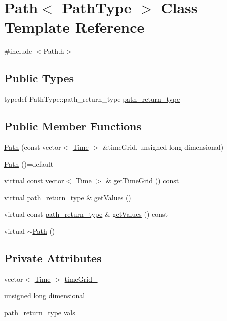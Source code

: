 \hypertarget{class_path}{}\section{Path$<$ Path\+Type $>$ Class Template Reference}
\label{class_path}


{\ttfamily \#include $<$Path.\+h$>$}

\subsection*{Public Types}
\begin{DoxyCompactItemize}
\item 
typedef Path\+Type\+::path\+\_\+return\+\_\+type \hyperlink{class_path_a3b1c34a87f7867f6fed2e0a33f801e7d}{path\+\_\+return\+\_\+type}
\end{DoxyCompactItemize}
\subsection*{Public Member Functions}
\begin{DoxyCompactItemize}
\item 
\hyperlink{class_path_af716cfa221637551e0b0a5b78be82d5c}{Path} (const vector$<$ \hyperlink{_name_def_8h_ac2d3e0ba793497bcca555c7c2cf64ff3}{Time} $>$ \&time\+Grid, unsigned long dimensional)
\item 
\hyperlink{class_path_a8437fecb95fe145057c957feb8b8955a}{Path} ()=default
\item 
virtual const vector$<$ \hyperlink{_name_def_8h_ac2d3e0ba793497bcca555c7c2cf64ff3}{Time} $>$ \& \hyperlink{class_path_a511b7a93c62893bcafba4749ad1dd1b3}{get\+Time\+Grid} () const
\item 
virtual \hyperlink{class_path_a3b1c34a87f7867f6fed2e0a33f801e7d}{path\+\_\+return\+\_\+type} \& \hyperlink{class_path_a8ba07fadae45801824240317c311bb84}{get\+Values} ()
\item 
virtual const \hyperlink{class_path_a3b1c34a87f7867f6fed2e0a33f801e7d}{path\+\_\+return\+\_\+type} \& \hyperlink{class_path_a2490ad69198170463f98c7d8f7212917}{get\+Values} () const
\item 
virtual \hyperlink{class_path_a83933167b70441af12427b23d88b0447}{$\sim$\+Path} ()
\end{DoxyCompactItemize}
\subsection*{Private Attributes}
\begin{DoxyCompactItemize}
\item 
vector$<$ \hyperlink{_name_def_8h_ac2d3e0ba793497bcca555c7c2cf64ff3}{Time} $>$ \hyperlink{class_path_a23350d9575ae171881cd45dc1ce2a701}{time\+Grid\+\_\+}
\item 
unsigned long \hyperlink{class_path_ad71125972f4c21aa8233b08dea6fca13}{dimensional\+\_\+}
\item 
\hyperlink{class_path_a3b1c34a87f7867f6fed2e0a33f801e7d}{path\+\_\+return\+\_\+type} \hyperlink{class_path_a6f90f314a504ea1c9828dd2aa999f6ff}{vals\+\_\+}
\end{DoxyCompactItemize}


